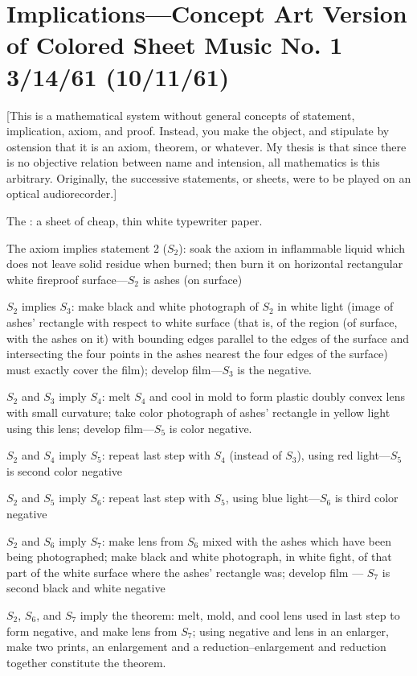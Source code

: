 \section{Implications---Concept Art Version of Colored Sheet Music No. 1 3/14/61 (10/11/61)}

[This is a mathematical system without general concepts of statement, 
implication, axiom, and proof. Instead, you make the object, and stipulate 
by ostension that it is an axiom, theorem, or whatever. My thesis is that 
since there is no objective relation between name and intension, all 
mathematics is this arbitrary. Originally, the successive statements, or sheets, 
were to be played on an optical audiorecorder.]

\begin{hangers}
The : a sheet of cheap, thin white typewriter paper.

The axiom implies statement 2 ($S_2$): soak the axiom in inflammable liquid which 
does not leave solid residue when burned; then burn it on horizontal 
rectangular white fireproof surface---$S_2$ is ashes (on surface) 

$S_2$ implies $S_3$: make black and white photograph of $S_2$ in white 
light (image of ashes' rectangle with respect to white surface (that is, of the 
region (of surface, with the ashes on it) with bounding edges parallel to the 
edges of the surface and intersecting the four points in the ashes nearest the 
four edges of the surface) must exactly cover the film); develop film---$S_3$ is 
the negative.

$S_2$ and $S_3$ imply $S_4$: melt $S_4$ and cool in mold to form plastic doubly 
convex lens with small curvature; take color photograph of ashes' rectangle 
in yellow light using this lens; develop film---$S_5$ is color negative.

$S_2$ and $S_4$ imply $S_5$: repeat last step with $S_4$ (instead of $S_3$), using red 
light---$S_5$ is second color negative 

$S_2$ and $S_5$ imply $S_6$: repeat last step with $S_5$, using blue light---$S_6$ is third 
color negative 

$S_2$ and $S_6$ imply $S_7$: make lens from $S_6$ mixed with the ashes which have 
been being photographed; make black and white photograph, in white fight, 
of that part of the white surface where the ashes' rectangle was; develop film 
--- $S_7$ is second black and white negative 

$S_2$, $S_6$, and $S_7$ imply the theorem: melt, mold, and cool lens used in last 
step to form negative, and make lens from $S_7$; using negative and lens in an 
enlarger, make two prints, an enlargement and a reduction--enlargement and 
reduction together constitute the theorem. 
\end{hangers}

